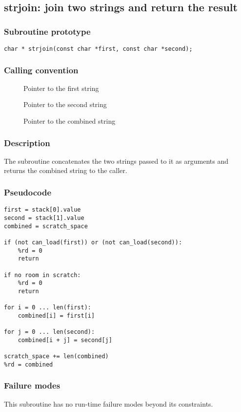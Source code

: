 \clearpage
{}
{}
\label{subr:strjoin}
\subsection*{strjoin: join two strings and return the result}

\subsubsection*{Subroutine prototype}

\begin{verbatim}
char * strjoin(const char *first, const char *second);
\end{verbatim}

\subsubsection*{Calling convention}

\begin{description}
\item[] Pointer to the first string
\item[] Pointer to the second string
\item[] Pointer to the combined string
\end{description}

\subsubsection*{Description}

The  subroutine concatenates the two strings
passed to it as arguments and returns the combined string to the
caller.

\subsubsection*{Pseudocode}

\begin{verbatim}
first = stack[0].value
second = stack[1].value
combined = scratch_space

if (not can_load(first)) or (not can_load(second)):
    %rd = 0
    return

if no room in scratch:
    %rd = 0
    return

for i = 0 ... len(first):
    combined[i] = first[i]

for j = 0 ... len(second):
    combined[i + j] = second[j]

scratch_space += len(combined)
%rd = combined
\end{verbatim}

\subsubsection*{Failure modes}

This subroutine has no run-time failure modes beyond its constraints.
